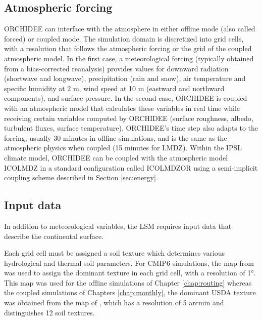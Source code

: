 \subsection{Atmospheric forcing}
ORCHIDEE can interface with the atmosphere in either offline mode (also called forced) or coupled mode. The simulation domain is discretized into grid cells, with a resolution that follows the atmospheric forcing or the grid of the coupled atmospheric model.
In the first case, a meteorological forcing (typically obtained from a bias-corrected reanalysis) provides values for downward radiation (shortwave and longwave), precipitation (rain and snow), air temperature and specific humidity at 2 m, wind speed at 10 m (eastward and northward components), and surface pressure. 
In the second case, ORCHIDEE is coupled with an atmospheric model that calculates these variables in real time while receiving certain variables computed by ORCHIDEE (surface roughness, albedo, turbulent fluxes, surface temperature). ORCHIDEE's time step also adapts to the forcing, usually 30 minutes in oflline simulations, and is the same as the atmospheric physics when coupled (15 minutes for LMDZ).
Within the IPSL climate model, ORCHIDEE can be coupled with the atmospheric model ICOLMDZ in a standard configuration called ICOLMDZOR using a semi-implicit coupling scheme described in Section \ref{sec:energy}.

\subsection{Input data}
\label{sec:ORCH_input_data}
In addition to meteorological variables, the LSM requires input data that describe the continental surface. 

Each grid cell must be assigned a soil texture which determines various hydrological and thermal soil parameters. 
For CMIP6 simulations, the map from \citet{zobler87802world} was used to assign the dominant texture in each grid cell, with a resolution of 1°. 
This map was used for the offline simulations of Chapter \ref{chap:routing}
whereas the coupled simulations of Chapters \ref{chap:monthly}, the dominant USDA texture was obtained from the map of \citet{reynolds_estimating_2000}, which has a resolution of 5 arcmin and distinguishes 12 soil textures.

